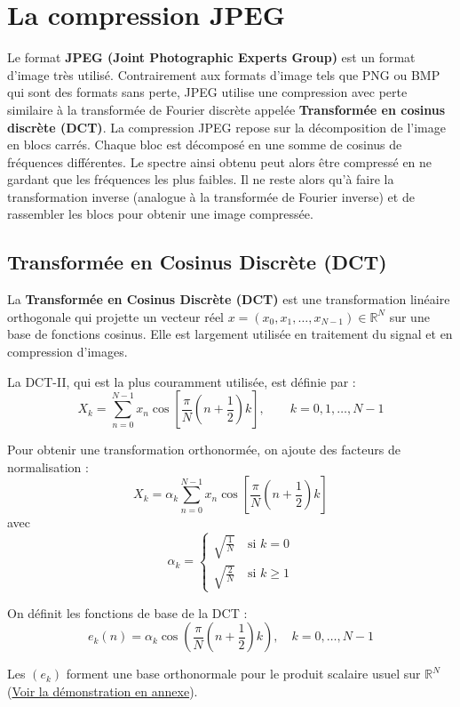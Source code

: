 \section{La compression JPEG}
Le format \textbf{JPEG (Joint Photographic Experts Group)} est un format d'image très utilisé. Contrairement aux formats d'image tels que PNG ou BMP qui sont des formats sans perte,
JPEG utilise une compression avec perte similaire à la transformée de Fourier discrète appelée \textbf{Transformée en cosinus discrète (DCT)}\cite{wiki-jpeg}. 
La compression JPEG repose sur la décomposition de l'image en blocs carrés.
Chaque bloc est décomposé en une somme de cosinus de fréquences différentes. Le spectre ainsi obtenu peut alors être compressé en ne gardant que les fréquences les plus faibles.
Il ne reste alors qu'à faire la transformation inverse (analogue à la transformée de Fourier inverse) et de rassembler les blocs pour obtenir une image compressée.

\subsection{Transformée en Cosinus Discrète (DCT)}
\label{section-DCT}
La \textbf{Transformée en Cosinus Discrète (DCT)} est une transformation linéaire orthogonale qui projette un vecteur réel 
$x = (x_0, x_1, \dots, x_{N-1}) \in \mathbb{R}^N$ sur une base de fonctions cosinus. Elle est largement utilisée en traitement du signal et en compression d'images.

La DCT-II\cite{wiki-dct}, qui est la plus couramment utilisée, est définie par :
$$X_k = \sum_{n=0}^{N-1}x_n\cos \left[\frac{\pi}{N}\left(n+\frac{1}{2}\right)k\right], \qquad k = 0,1,\dots,N-1$$

Pour obtenir une transformation orthonormée, on ajoute des facteurs de normalisation :
$$X_k = \alpha_k\sum_{n=0}^{N-1}x_n\cos \left[\frac{\pi}{N}\left(n+\frac{1}{2}\right)k\right]$$
avec 
$$\alpha_k = \left\{ 
    \begin{array}{cl}\sqrt{\frac{1}{N}} \quad \text{si } k=0 
    \\\sqrt{\frac{2}{N}} \quad \text{si } k \ge 1 
\end{array} \right.$$

On définit les fonctions de base de la DCT :
$$ e_k(n) = \alpha_k \cos\left(\frac{\pi}{N}\left(n+\frac{1}{2}\right)k\right),\quad k=0,\dots,N-1 $$

Les $(e_k)$ forment une base orthonormale pour le produit scalaire usuel sur $\mathbb{R}^N$ (\hyperref[preuve-base-DCT]{Voir la démonstration en annexe}).


